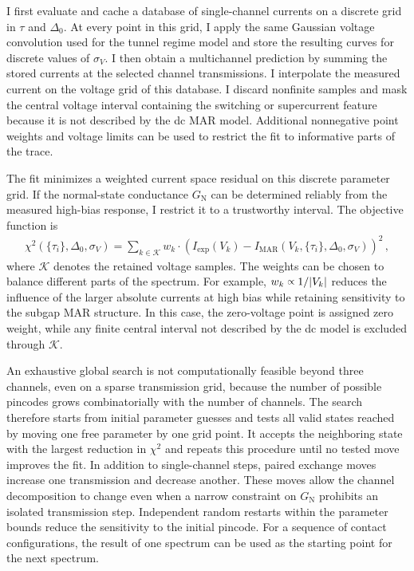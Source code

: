             I first evaluate and cache a database of single-channel currents on a discrete grid in $\tau$ and $\Delta_0$. At every point in this grid, I apply the same Gaussian voltage convolution used for the tunnel regime model and store the resulting curves for discrete values of $\sigma_V$. I then obtain a multichannel prediction by summing the stored currents at the selected channel transmissions. I interpolate the measured current on the voltage grid of this database. I discard nonfinite samples and mask the central voltage interval containing the switching or supercurrent feature because it is not described by the dc MAR model. Additional nonnegative point weights and voltage limits can be used to restrict the fit to informative parts of the trace.

            The fit minimizes a weighted current space residual on this discrete parameter grid. If the normal-state conductance $G_\mathrm{N}$ can be determined reliably from the measured high-bias response, I restrict it to a trustworthy interval. The objective function is
            \begin{align}
                \chi^2(\{\tau_i\}, \Delta_0, \sigma_V)
                =
                \sum_{k\in\mathcal K}
                w_k \cdot
                \left(
                    I_\mathrm{exp}(V_k)
                    -
                    I_\mathrm{MAR}(V_k,\{\tau_i\}, \Delta_0, \sigma_V)
                \right)^2\,,
                \label{eq:methods:digital:mar:chi2}
            \end{align}
            where $\mathcal K$ denotes the retained voltage samples. The weights can be chosen to balance different parts of the spectrum. For example, $w_k\spropto1/|V_k|$ reduces the influence of the larger absolute currents at high bias while retaining sensitivity to the subgap MAR structure. In this case, the zero-voltage point is assigned zero weight, while any finite central interval not described by the dc model is excluded through $\mathcal K$.
            
            An exhaustive global search is not computationally feasible beyond three channels, even on a sparse transmission grid, because the number of possible pincodes grows combinatorially with the number of channels. The search therefore starts from initial parameter guesses and tests all valid states reached by moving one free parameter by one grid point. It accepts the neighboring state with the largest reduction in $\chi^2$ and repeats this procedure until no tested move improves the fit. In addition to single-channel steps, paired exchange moves increase one transmission and decrease another. These moves allow the channel decomposition to change even when a narrow constraint on $G_\mathrm{N}$ prohibits an isolated transmission step. Independent random restarts within the parameter bounds reduce the sensitivity to the initial pincode. For a sequence of contact configurations, the result of one spectrum can be used as the starting point for the next spectrum.

